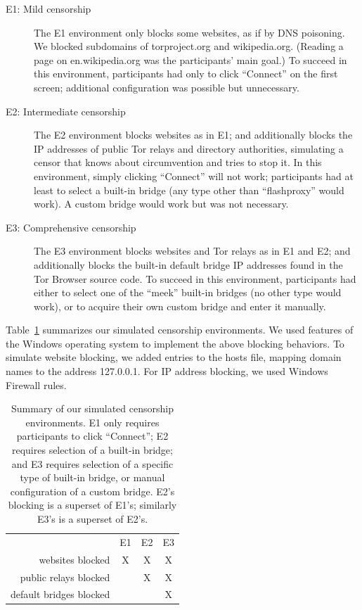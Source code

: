 \documentclass[USenglish,oneside,twocolumn]{article}
\begin{document}
\begin{description}
\item[E1: Mild censorship]
The E1 environment only blocks some websites,
as if by DNS poisoning.
We blocked subdomains of torproject.org
and wikipedia.org.
(Reading a page on en.wikipedia.org was the participants' main goal.)
To succeed in this environment,
participants had only to click ``Connect'' on the first screen;
additional configuration was possible but unnecessary.

\item[E2: Intermediate censorship]
The E2 environment blocks websites as in E1;
and additionally blocks the IP addresses of public Tor relays
and directory authorities, simulating a censor that knows
about circumvention and tries to stop it.
In this environment, simply clicking ``Connect'' will not work;
participants had at least to select a built-in bridge
(any type other than ``flashproxy'' would work).
A custom bridge would work but was not necessary.

\item[E3: Comprehensive censorship]
The E3 environment blocks websites and Tor relays as in E1 and E2;
and additionally blocks the built-in default bridge IP addresses
found in the Tor Browser source code.
To succeed in this environment, participants had either to select
one of the ``meek'' built-in bridges (no other type would work),
or to acquire their own custom bridge and enter it manually.
\end{description}

\smallskip

Table~\ref{tab:environments} summarizes our simulated censorship
environments. We used features of the Windows operating system 
to implement the above blocking behaviors.
To simulate website blocking, we added entries to the hosts file,
mapping domain names to the address 127.0.0.1.
For IP address blocking, we used Windows Firewall rules.

\begin{table}
\centering
\begin{tabular}{r c c c}
& E1 & E2 & E3 \\
websites blocked & X & X & X \\
public relays blocked & & X & X \\
default bridges blocked & & & X \\
\end{tabular}
\caption{
Summary of our simulated censorship environments.
E1 only requires participants to click ``Connect'';
E2 requires selection of a built-in bridge;
and E3 requires selection of a specific type of built-in bridge,
or manual configuration of a custom bridge.
E2's blocking is a superset of E1's;
similarly E3's is a superset of E2's.
}
\label{tab:environments}
\end{table}
\end{document}
